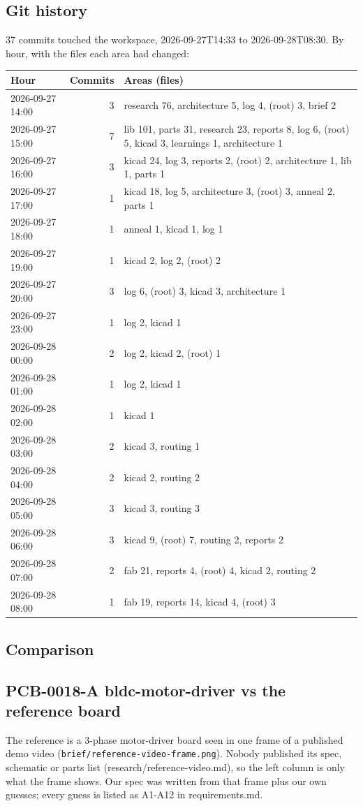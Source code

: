 \documentclass[11pt,a4paper]{article}
\begin{document}
\subsection*{Git history}
37 commits touched the workspace, 2026-09-27T14:33 to 2026-09-28T08:30. By hour, with the files each area had changed:
{\small
\begin{longtable}{lrp{10cm}}
\toprule
\textbf{Hour} & \textbf{Commits} & \textbf{Areas (files)} \\
\midrule
\endhead
2026-09-27 14:00 & 3 & research 76, architecture 5, log 4, (root) 3, brief 2 \\
2026-09-27 15:00 & 7 & lib 101, parts 31, research 23, reports 8, log 6, (root) 5, kicad 3, learnings 1, architecture 1 \\
2026-09-27 16:00 & 3 & kicad 24, log 3, reports 2, (root) 2, architecture 1, lib 1, parts 1 \\
2026-09-27 17:00 & 1 & kicad 18, log 5, architecture 3, (root) 3, anneal 2, parts 1 \\
2026-09-27 18:00 & 1 & anneal 1, kicad 1, log 1 \\
2026-09-27 19:00 & 1 & kicad 2, log 2, (root) 2 \\
2026-09-27 20:00 & 3 & log 6, (root) 3, kicad 3, architecture 1 \\
2026-09-27 23:00 & 1 & log 2, kicad 1 \\
2026-09-28 00:00 & 2 & log 2, kicad 2, (root) 1 \\
2026-09-28 01:00 & 1 & log 2, kicad 1 \\
2026-09-28 02:00 & 1 & kicad 1 \\
2026-09-28 03:00 & 2 & kicad 3, routing 1 \\
2026-09-28 04:00 & 2 & kicad 2, routing 2 \\
2026-09-28 05:00 & 3 & kicad 3, routing 3 \\
2026-09-28 06:00 & 3 & kicad 9, (root) 7, routing 2, reports 2 \\
2026-09-28 07:00 & 2 & fab 21, reports 4, (root) 4, kicad 2, routing 2 \\
2026-09-28 08:00 & 1 & fab 19, reports 14, kicad 4, (root) 3 \\
\bottomrule
\end{longtable}
}
\subsection*{Comparison}
\subsection*{PCB-0018-A bldc-motor-driver vs the reference board}
The reference is a 3-phase motor-driver board seen in one frame of a published demo video (\texttt{brief/reference-video-frame.png}). Nobody published its spec, schematic or parts list (research/reference-video.md), so the left column is only what the frame shows. Our spec was written from that frame plus our own guesses; every guess is listed as A1-A12 in requirements.md.
\end{document}
